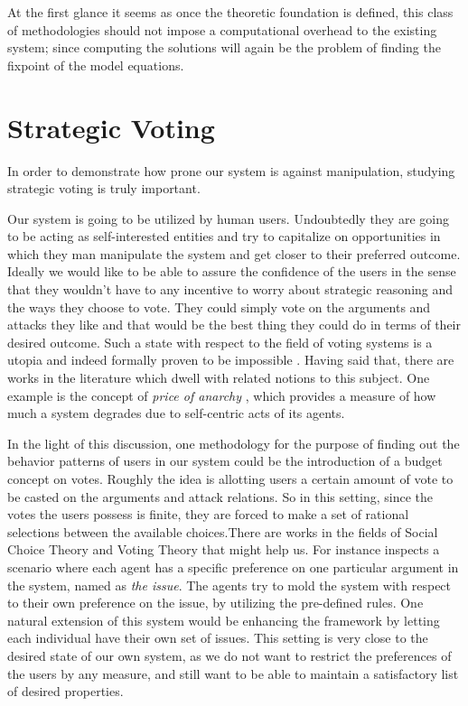 \documentclass{article}
\begin{document}
At the first glance it seems as once the theoretic foundation is defined, this class of methodologies should not impose a computational overhead to the existing system; since computing the solutions will again be the problem of finding the fixpoint of the model equations.


\section{Strategic Voting}
In order to demonstrate how prone our system is against manipulation, studying strategic voting is truly important.

Our system is going to be utilized by human users. Undoubtedly they are going to be acting as self-interested entities and try to capitalize on opportunities in which they man manipulate the system and get closer to their preferred outcome. Ideally we would like to be able to assure the confidence of the users in the sense that they wouldn't have to any incentive to worry about strategic reasoning and the ways they choose to vote. They could simply vote on the arguments and attacks they like and that would be the best thing they could do in terms of their desired outcome. Such a state with respect to the field of voting systems is a utopia and indeed formally proven to be impossible \cite{arrow}. Having said that, there are works in the literature which dwell with related notions to this subject. One example is the concept of \textit{price of anarchy}  \cite{koutsoupiasP99}, which provides a measure of how much a system degrades due to self-centric acts of its agents.

In the light of this discussion, one methodology for the purpose of finding out the behavior patterns of users in our system could be the introduction of a budget concept on votes. Roughly the idea is allotting users a certain amount of vote to be casted on the arguments and attack relations. So in this setting, since the votes the users possess is finite, they are forced to make a set of rational selections between the available choices.There are works in the fields of Social Choice Theory and Voting Theory that might help us. For instance \cite{bonzonmaudet11} inspects a scenario where each agent has a specific preference on one particular argument in the system, named as \textit{the issue}. The agents try to mold the system with respect to their own preference on the issue, by utilizing the pre-defined rules. One natural extension of this system would be enhancing the framework by letting each individual have their own set of issues. This setting is very close to the desired state of our own system, as we do not want to restrict the preferences of the users by any measure, and still want to be able to maintain a satisfactory list of desired properties.  
\end{document}
